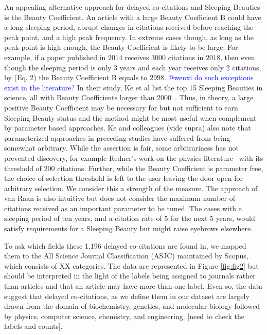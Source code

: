 \documentclass[utf8]{frontiersSCNS}
\begin{document}
An appealing alternative approach for delayed co-citations and Sleeping Beauties is the Beauty Coefficient. An article with a large Beauty Coefficient B could have a long sleeping period, abrupt changes in citations received before reaching the peak point, and a high peak frequency. In extreme cases though, as long as the peak point is high enough, the Beauty Coefficient is likely to be large. For example, if a paper published in $2014$ receives $3000$ citations in $2018$, then even though the sleeping period is only $3$ years and each year receives only $2$ citations, by (Eq. 2) the Beauty Coefficient B equals to $2998$. \textcolor{blue}{@wenxi do such exceptions exist in the literature?} In their study, Ke et al list the top 15 Sleeping Beauties in science, all with Beauty Coefficients larger than 2000~\citep{Ke2015}. Thus, in theory, a large positive Beauty Coefficient may be necessary for but not sufficient to earn Sleeping Beauty status and the method might be most useful when complement by parameter based approaches. Ke and colleagues (vide supra) also note that parameterized approaches in preceding studies have suffered from being somewhat arbitrary. While the assertion is fair, some arbitrariness has not prevented discovery, for example Redner's work on the physics literature~\citep{redner_2005} with its threshold of 200 citations. Further, while the Beauty Coefficient is parameter free, the choice of selection threshold is left to the user leaving the door open for arbitrary selection. We consider this a strength of the measure. The approach of van Raan is also intuitive but does not consider the maximum number of citations received as an important parameter to be tuned.  The cases with a sleeping period of ten years, and a citation rate of 5 for the next 5 years, would satisfy requirements for a Sleeping Beauty but might raise eyebrows elsewhere.

To ask which fields these 1,196 delayed co-citations are found in, we mapped them to the All Science Journal Classification (ASJC) maintained by Scopus, which consists of XX categories.  The data are represented in Figure \ref{fig:fig2} but should be interpreted in the light of the labels being assigned to journals rather than articles and that an article may have more than one label. Even so, the data suggest that delayed co-citations, as we define them in our dataset are largely drawn from the domain of biochemistry, genetics, and molecular biology followed by physics, computer science, chemistry, and engineering. [need to check the labels and counts].
\end{document}
